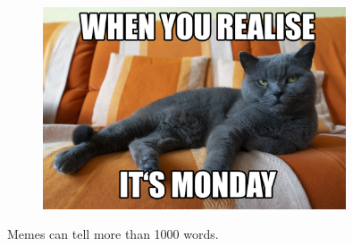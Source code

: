 \documentclass{article}
\begin{document}
\begin{figure}[h]
    \centering
    \includegraphics[width=0.8\textwidth]{meme.png}
\end{figure}

\begin{center}
    Memes can tell more than 1000 words.
\end{center}
\end{document}
